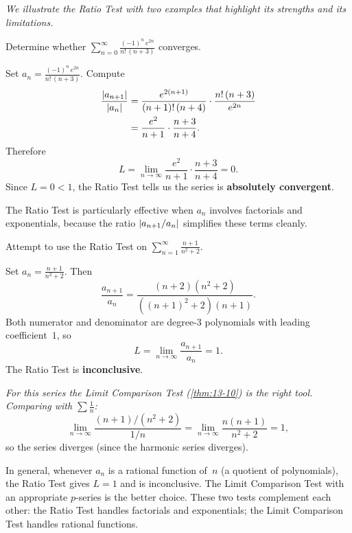 \textit{We illustrate the Ratio Test with two examples that highlight its strengths and its limitations.}

\begin{example}
\label{ex:13-17}
Determine whether $\displaystyle\sum_{n=0}^{\infty}\frac{(-1)^{n}\,e^{2n}}{n!\,(n+3)}$ converges.

Set $a_{n}=\frac{(-1)^{n}\,e^{2n}}{n!\,(n+3)}$.  Compute
\begin{align*}
  \frac{\left\lvert a_{n+1} \right\rvert}{\left\lvert a_{n} \right\rvert}
  &= \frac{e^{2(n+1)}}{(n+1)!\,(n+4)}\cdot\frac{n!\,(n+3)}{e^{2n}} \\
  &= \frac{e^{2}}{n+1}\cdot\frac{n+3}{n+4}.
\end{align*}
Therefore
\[
  L = \lim_{n\to\infty}\frac{e^{2}}{n+1}\cdot\frac{n+3}{n+4} = 0.
\]
Since $L=0<1$, the Ratio Test tells us the series is \textbf{absolutely convergent}.
\end{example}

\begin{remark}
The Ratio Test is particularly effective when $a_{n}$ involves factorials and exponentials, because the ratio $\left\lvert a_{n+1}/a_{n} \right\rvert$ simplifies these terms cleanly.
\end{remark}

\begin{example}
\label{ex:13-18}
Attempt to use the Ratio Test on $\displaystyle\sum_{n=1}^{\infty}\frac{n+1}{n^{2}+2}$.

Set $a_{n}=\frac{n+1}{n^{2}+2}$.  Then
\[
  \frac{a_{n+1}}{a_{n}} = \frac{(n+2)(n^{2}+2)}{((n+1)^{2}+2)(n+1)}.
\]
Both numerator and denominator are degree-$3$ polynomials with leading coefficient~$1$, so
\[
  L = \lim_{n\to\infty}\frac{a_{n+1}}{a_{n}} = 1.
\]
The Ratio Test is \textbf{inconclusive}.
\end{example}

\textit{For this series the Limit Comparison Test (\cref{thm:13-10}) is the right tool.  Comparing with $\sum\frac{1}{n}$:}
\[
  \lim_{n\to\infty}\frac{(n+1)/(n^{2}+2)}{1/n} = \lim_{n\to\infty}\frac{n(n+1)}{n^{2}+2} = 1,
\]
so the series diverges (since the harmonic series diverges).

\begin{remark}
In general, whenever $a_{n}$ is a rational function of~$n$ (a quotient of polynomials), the Ratio Test gives $L=1$ and is inconclusive.  The Limit Comparison Test with an appropriate $p$-series is the better choice.  These two tests complement each other: the Ratio Test handles factorials and exponentials; the Limit Comparison Test handles rational functions.
\end{remark}
